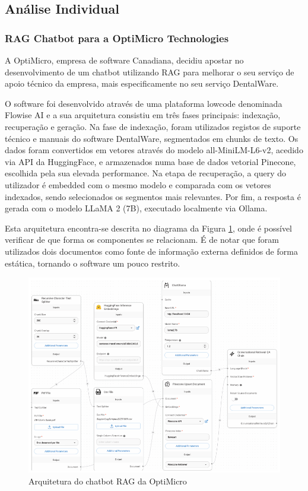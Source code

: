 \subsection{Análise Individual}

\subsubsection{RAG Chatbot para a OptiMicro Technologies}

A OptiMicro, empresa de software Canadiana, decidiu apostar no desenvolvimento de um chatbot utilizando RAG para melhorar o seu serviço de apoio técnico da empresa, mais especificamente no seu serviço DentalWare.

O software foi desenvolvido através de uma plataforma lowcode denominada Flowise AI e a sua arquitetura consistiu em três fases principais: indexação, recuperação e geração. Na fase de indexação, foram utilizados registos de suporte técnico e manuais do software DentalWare, segmentados em chunks de texto. Os dados foram convertidos em vetores através do modelo all-MiniLM-L6-v2, acedido via API da HuggingFace, e armazenados numa base de dados vetorial Pinecone, escolhida pela sua elevada performance. Na etapa de recuperação, a query do utilizador é embedded com o mesmo modelo e comparada com os vetores indexados, sendo selecionados os segmentos mais relevantes. Por fim, a resposta é gerada com o modelo LLaMA 2 (7B), executado localmente via Ollama. 

Esta arquitetura encontra-se descrita no diagrama da Figura \ref{fig:opti-micro-arch}, onde é possível verificar de que forma os componentes se relacionam. É de notar que foram utilizados dois documentos como fonte de informação externa definidos de forma estática, tornando o software um pouco restrito.

\begin{figure}[H]
        \centering
        \includegraphics[width=1\linewidth]{ch3/assets/optimicro-arch.png}
        \caption{Arquitetura do chatbot RAG da OptiMicro \parencite{lee2024development}}
        \label{fig:opti-micro-arch}
\end{figure}


